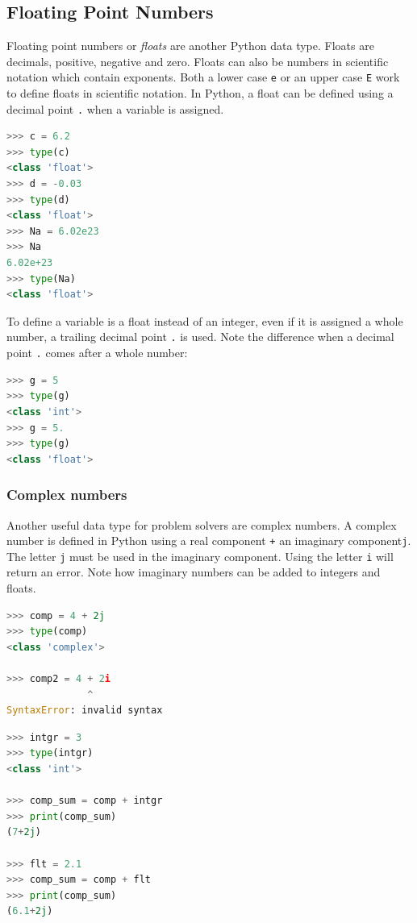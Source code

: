 \documentclass{book}
\begin{document}
    \subsection{Floating Point Numbers}\label{floating-point-numbers}

Floating point numbers or \emph{floats} are another Python data type.
Floats are decimals, positive, negative and zero. Floats can also be
numbers in scientific notation which contain exponents. Both a lower
case \lstinline!e! or an upper case \lstinline!E! work to define floats
in scientific notation. In Python, a float can be defined using a
decimal point \lstinline!.! when a variable is assigned.

\begin{lstlisting}[language=Python]
>>> c = 6.2
>>> type(c)
<class 'float'>
>>> d = -0.03
>>> type(d)
<class 'float'>
>>> Na = 6.02e23
>>> Na
6.02e+23
>>> type(Na)
<class 'float'>
\end{lstlisting}

To define a variable is a float instead of an integer, even if it is
assigned a whole number, a trailing decimal point \lstinline!.! is used.
Note the difference when a decimal point \lstinline!.! comes after a
whole number:

\begin{lstlisting}[language=Python]
>>> g = 5
>>> type(g)
<class 'int'>
>>> g = 5.
>>> type(g)
<class 'float'>
\end{lstlisting}

    \subsubsection{Complex numbers}\label{complex-numbers}

Another useful data type for problem solvers are complex numbers. A
complex number is defined in Python using a real component \lstinline!+!
an imaginary component\lstinline!j!. The letter \lstinline!j! must be
used in the imaginary component. Using the letter \lstinline!i! will
return an error. Note how imaginary numbers can be added to integers and
floats.

\begin{lstlisting}[language=Python]
>>> comp = 4 + 2j
>>> type(comp)
<class 'complex'>

>>> comp2 = 4 + 2i
              ^
SyntaxError: invalid syntax
\end{lstlisting}

\begin{lstlisting}[language=Python]
>>> intgr = 3
>>> type(intgr)
<class 'int'>

>>> comp_sum = comp + intgr
>>> print(comp_sum)
(7+2j)

>>> flt = 2.1
>>> comp_sum = comp + flt
>>> print(comp_sum)
(6.1+2j)
\end{lstlisting}
\end{document}
